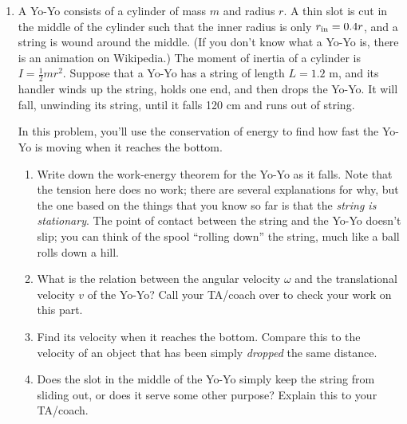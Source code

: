 \documentclass[12pt]{article}
\begin{document}
\begin{enumerate}
\newpage


\item A Yo-Yo consists of a cylinder of mass $m$ and radius $r$. A thin slot is cut in the middle of the cylinder such that the inner radius is only $r_{\rm in}=0.4r$, and a string is wound around the middle. (If you don't know what a Yo-Yo is, there is an animation on Wikipedia.) The moment of inertia of a cylinder is $I=\frac{1}{2}mr^2$. Suppose that a Yo-Yo has a string of length $L=1.2$ m, and its handler winds up the string, holds one end, and then drops the Yo-Yo. It will fall, unwinding its string,
until it falls 120 cm and runs out of string.

In this problem, you'll use the conservation of energy to find how fast the Yo-Yo is moving when it reaches the bottom.

\begin{enumerate}

\item Write down the work-energy theorem for the Yo-Yo as it falls. Note that the tension here does no work; there are several explanations for why, but the one based on the things that you know so far is that the {\it string is stationary}. 
The point of contact between the string and the Yo-Yo doesn't slip; you can think of the spool ``rolling down'' the string, much like a ball rolls down a hill.

\vspace{3.5in}

\item What is the relation between the angular velocity $\omega$ and the translational velocity $v$ of the Yo-Yo? Call your TA/coach over to check your work on this part.

\vspace{3.5in}

\newpage

\item Find its velocity when it reaches the bottom. Compare this to the velocity of an object that has been simply {\it dropped} the same distance.

\vspace{3.5in}

\item Does the slot in the middle of the Yo-Yo simply keep the string from sliding out, or does it serve some other purpose? Explain this to your TA/coach.

\end{enumerate}
\end{enumerate}
\end{document}
